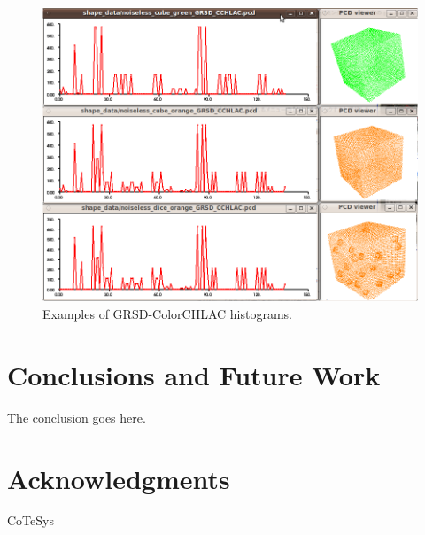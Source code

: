 \documentclass[conference]{sty/IEEEtran}
\begin{document}
\begin{figure}[htb!]
  \begin{center}
    \includegraphics[width=.9\columnwidth]{figures/colorCHLAC/GRSD_CCHLAC.png}
    \caption{Examples of GRSD-ColorCHLAC histograms.}
    \label{fig:grsd_cchlac}
  \end{center}
\end{figure}

\section{Conclusions and Future Work} 
The conclusion goes here.

\section*{Acknowledgments}
CoTeSys



\end{document}
